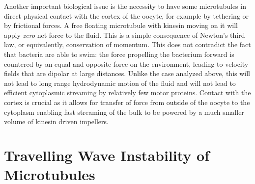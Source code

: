 \documentclass[11pt]{ucthesis}
\def\br{{\bf r}}
\begin{document}
Another important biological issue is the necessity to have some microtubules in direct physical contact
with the cortex of the
oocyte, for example by tethering or by frictional forces. A free floating microtubule with kinesin moving on it will apply {\em zero} net force
to the fluid. This is a simple consequence of Newton's third law, or equivalently, conservation
of momentum. This does not contradict
the fact that bacteria are able to swim: the force propelling the bacterium forward is
countered by an equal and opposite force on the environment, leading to velocity fields that
are dipolar at large distances. Unlike the case analyzed above, this will not lead to long range hydrodynamic motion
of the fluid and will not lead to efficient cytoplasmic streaming by relatively few motor proteins. 
Contact with the cortex is crucial as it allows for transfer of force from outside of
the oocyte to the cytoplasm enabling fast streaming of the bulk to be powered by a much smaller volume of kinesin driven
impellers.

\section{Travelling Wave Instability of Microtubules}

\end{document}
